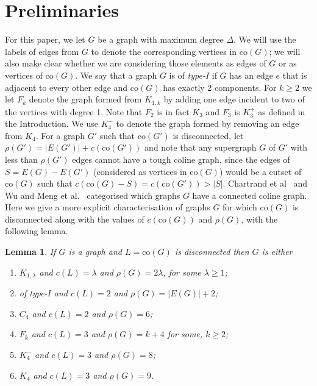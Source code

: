 \documentclass[12pt]{article}
\newtheorem{lem}[thm]{Lemma}
\theoremstyle{definition}
\newcommand{\com}[1]{{\color{blue} #1}}
\newcommand{\co}{\text{co}}
\begin{document}
\section{Preliminaries}\label{s:pre}
For this paper, we let $G$ be a graph with maximum degree $\Delta$.
We will use the labels of edges from $G$ to denote the corresponding vertices in $\co(G)$; we will also make clear whether we are considering those elements as edges of $G$ or as vertices of $\co(G)$. 
We say that a graph $G$ is of \emph{type-$I$} if $G$ has an edge $e$ that is adjacent to every other edge and $\co(G)$ has exactly 2 components. 
For $k\geq 2$ we let $F_k$ denote the graph formed from $K_{1,k}$ by adding one edge incident to two of the vertices with degree 1. Note that $F_2$ is in fact $K_3$ and $F_3$ is $K_3^+$ as defined in the Introduction.
We use $K_4^-$ to denote the graph formed by removing an edge from $K_4$.
For a graph $G'$ such that $\co(G')$ is disconnected, let $\rho(G') = |E(G')|+c(\co(G'))$ and note that any supergraph $G$ of $G'$ with less than $\rho(G')$ edges cannot have a tough coline graph, since the edges of $S=E(G)-E(G')$ (considered as vertices in $\co(G)$) would be a cutset of $\co(G)$ such that $c(\co(G)-S)=c(\co(G'))>|S|$.
Chartrand et al~\cite{ChHeJaSc97} and Wu and Meng et al.~\cite{WuMe04} categorised which graphs $G$ have a connected coline graph.
Here we give a more explicit characterisation of graphs $G$ for which $\co(G)$ is disconnected along with the values of $c(\co(G))$ and $\rho(G)$,
with the following lemma.
\begin{lem}\label{l:disconColineGraph}
If $G$ is a graph and $L=\co(G)$ is disconnected then $G$ is either
\begin{enumerate}
\item[(i)] $K_{1,\lambda}$ and $c(L)=\lambda$ and $\rho(G)=2\lambda$, for some $\lambda \geq 1$; 
\item[(ii)] of type-$I$ and $c(L)=2$ and $\rho(G)=|E(G)|+2$; 
\item[(iii)] $C_4$ and $c(L)=2$ and $\rho(G)=6$;
\item[(iv)] $F_k$ and $c(L)=3$ and $\rho(G) = k+4$ for some, $k\geq 2$;  %
\item[(v)] $K_4^-$ and $c(L) = 3$ and $\rho(G)=8$; 
\item[(vi)] $K_4$ and $c(L)=3$ and $\rho(G)=9$.
\end{enumerate}
\end{lem}
\end{document}

